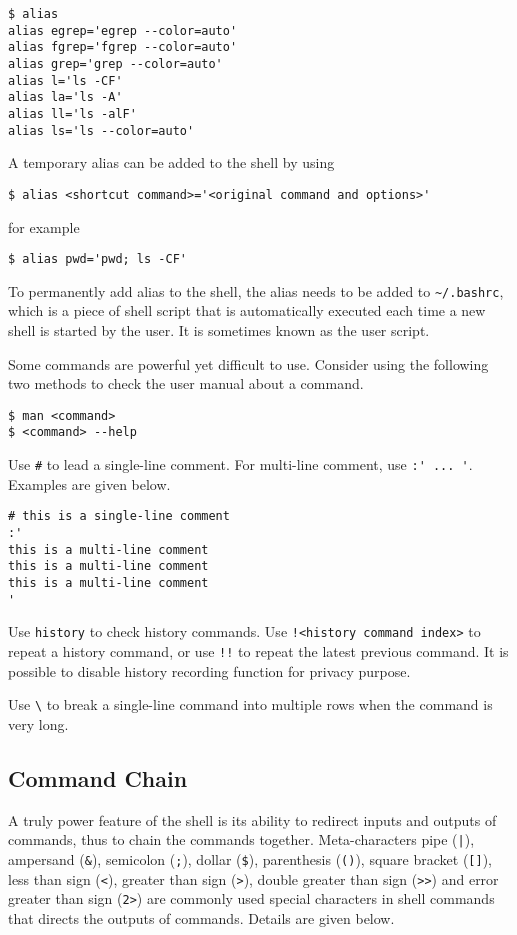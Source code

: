 \begin{lstlisting}
$ alias
alias egrep='egrep --color=auto'
alias fgrep='fgrep --color=auto'
alias grep='grep --color=auto'
alias l='ls -CF'
alias la='ls -A'
alias ll='ls -alF'
alias ls='ls --color=auto'
\end{lstlisting}

A temporary alias can be added to the shell by using
\begin{lstlisting}
$ alias <shortcut command>='<original command and options>'
\end{lstlisting}
for example
\begin{lstlisting}
$ alias pwd='pwd; ls -CF'
\end{lstlisting}

To permanently add alias to the shell, the alias needs to be added to \verb|~/.bashrc|, which is a piece of shell script that is automatically executed each time a new shell is started by the user. It is sometimes known as the user script.

Some commands are powerful yet difficult to use. Consider using the following two methods to check the user manual about a command.
\begin{lstlisting}
$ man <command>
$ <command> --help
\end{lstlisting}

Use \verb|#| to lead a single-line comment. For multi-line comment, use \verb|:' ... '|. Examples are given below.
\begin{lstlisting}
# this is a single-line comment
:'
this is a multi-line comment
this is a multi-line comment
this is a multi-line comment
'
\end{lstlisting}

Use \verb|history| to check history commands. Use \verb|!<history command index>| to repeat a history command, or use \verb|!!| to repeat the latest previous command. It is possible to disable history recording function for privacy purpose.

Use \verb|\| to break a single-line command into multiple rows when the command is very long.

\subsection{Command Chain}

A truly power feature of the shell is its ability to redirect inputs and outputs of commands, thus to chain the commands together. Meta-characters pipe (\verb?|?), ampersand (\verb|&|), semicolon (\verb|;|), dollar (\verb|$|), parenthesis (\verb|()|), square bracket (\verb|[]|), less than sign (\verb|<|), greater than sign (\verb|>|), double greater than sign (\verb|>>|) and error greater than sign (\verb|2>|) are commonly used special characters in shell commands that directs the outputs of commands. Details are given below.

